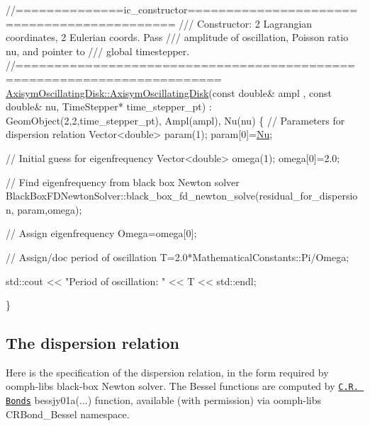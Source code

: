  
\begin{DoxyCodeInclude}
\textcolor{comment}{//==============ic\_constructor============================================}
\textcolor{comment}{/// Constructor: 2 Lagrangian coordinates, 2 Eulerian coords. Pass }
\textcolor{comment}{}\textcolor{comment}{/// amplitude of oscillation, Poisson ratio nu, and pointer to }
\textcolor{comment}{}\textcolor{comment}{/// global timestepper. }
\textcolor{comment}{}\textcolor{comment}{//========================================================================}
\hyperlink{classAxisymOscillatingDisk_a7671a9c1b8d4d854752ea14aa4f5865d}{AxisymOscillatingDisk::AxisymOscillatingDisk}(\textcolor{keyword}{const} \textcolor{keywordtype}{double}& ampl
      ,
                                             \textcolor{keyword}{const} \textcolor{keywordtype}{double}& nu, 
                                             TimeStepper* time\_stepper\_pt) : 
 GeomObject(2,2,time\_stepper\_pt), Ampl(ampl), Nu(nu)
\{
 \textcolor{comment}{// Parameters for dispersion relation}
 Vector<double> param(1);
 param[0]=\hyperlink{namespaceGlobal__Physical__Variables_a3962c36313826b19f216f6bbbdd6a477}{Nu};
 
 \textcolor{comment}{// Initial guess for eigenfrequency}
 Vector<double> omega(1);
 omega[0]=2.0; 
 
 \textcolor{comment}{// Find eigenfrequency from black box Newton solver}
 BlackBoxFDNewtonSolver::black\_box\_fd\_newton\_solve(residual\_for\_dispersion,
                                                   param,omega);

 \textcolor{comment}{// Assign eigenfrequency}
 Omega=omega[0];
 
 \textcolor{comment}{// Assign/doc period of oscillation}
 T=2.0*MathematicalConstants::Pi/Omega;

 std::cout << \textcolor{stringliteral}{"Period of oscillation: "} << T << std::endl;

\}

\end{DoxyCodeInclude}




\hypertarget{index_dispersion}{}\subsection{The dispersion relation}\label{index_dispersion}
Here is the specification of the dispersion relation, in the form required by {\ttfamily oomph-\/lib\textquotesingle{}s} black-\/box Newton solver. The Bessel functions are computed by \href{http://www.crbond.com/}{\tt C.\+R. Bond\textquotesingle{}s} {\ttfamily bessjy01a}(...) function, available (with permission) via {\ttfamily oomph-\/lib\textquotesingle{}s} {\ttfamily C\+R\+Bond\+\_\+\+Bessel} namespace.

